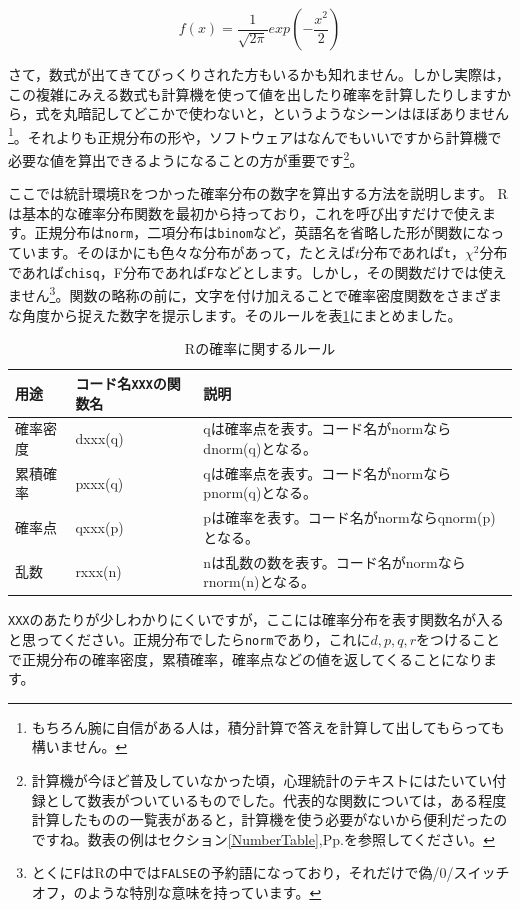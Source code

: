 \documentclass{ltjbook}
\begin{document}
\[ f(x) = \frac{1}{\sqrt{2\pi}} exp(-\frac{x^2}{2})   \]


さて，数式が出てきてびっくりされた方もいるかも知れません。しかし実際は，この複雑にみえる数式も計算機を使って値を出したり確率を計算したりしますから，式を丸暗記してどこかで使わないと，というようなシーンはほぼありません\footnote{もちろん腕に自信がある人は，積分計算で答えを計算して出してもらっても構いません。}。それよりも正規分布の形や，ソフトウェアはなんでもいいですから計算機で必要な値を算出できるようになることの方が重要です\footnote{計算機が今ほど普及していなかった頃，心理統計のテキストにはたいてい付録として数表がついているものでした。代表的な関数については，ある程度計算したものの一覧表があると，計算機を使う必要がないから便利だったのですね。数表の例はセクション\ref{NumberTable},Pp.\pageref{NumberTable}を参照してください。}。

ここでは統計環境Rをつかった確率分布の数字を算出する方法を説明します。
Rは基本的な確率分布関数を最初から持っており，これを呼び出すだけで使えます。正規分布は\verb|norm|，二項分布は\verb|binom|など，英語名を省略した形が関数になっています。そのほかにも色々な分布があって，たとえば$t$分布であれば\texttt{t}，$\chi^2$分布であれば\texttt{chisq}，F分布であれば\texttt{F}などとします。しかし，その関数だけでは使えません\footnote{とくに\verb|F|はRの中では\verb|FALSE|の予約語になっており，それだけで偽/0/スイッチオフ，のような特別な意味を持っています。}。関数の略称の前に，文字を付け加えることで確率密度関数をさまざまな角度から捉えた数字を提示します。そのルールを表\ref{tbl::08_02}にまとめました。

\begin{table}[ht]
	\caption{Rの確率に関するルール}
	\centering
	\begin{tabular}{lll}
		用途   & コード名\texttt{XXX}の関数名 & 説明                                \\\hline
		確率密度 & dxxx(q)              & qは確率点を表す。コード名がnormならdnorm(q)となる。  \\
		累積確率 & pxxx(q)              & qは確率点を表す。コード名がnormならpnorm(q)となる。  \\
		確率点  & qxxx(p)              & pは確率を表す。コード名がnormならqnorm(p)となる。   \\
		乱数   & rxxx(n)              & nは乱数の数を表す。コード名がnormならrnorm(n)となる。 \\\hline
	\end{tabular}
	\label{tbl::08_02}
\end{table}

\texttt{XXX}のあたりが少しわかりにくいですが，ここには確率分布を表す関数名が入ると思ってください。正規分布でしたら\texttt{norm}であり，これに$d,p,q,r$をつけることで正規分布の確率密度，累積確率，確率点などの値を返してくることになります。
\end{document}
